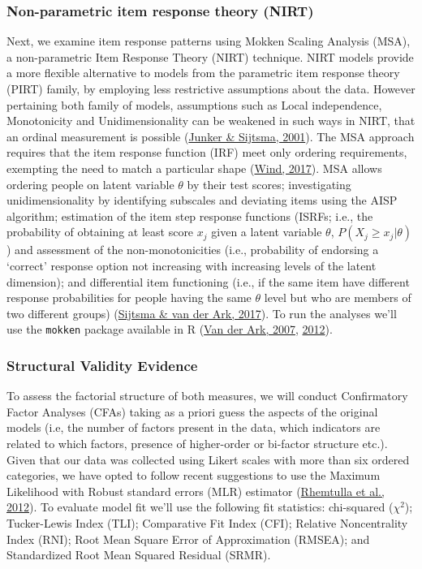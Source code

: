 \documentclass[
  ,doc,11pt, twoside,floatsintext]{apa6}
\begin{document}
\hypertarget{non-parametric-item-response-theory-nirt}{%
\subsubsection{Non-parametric item response theory (NIRT)}\label{non-parametric-item-response-theory-nirt}}

Next, we examine item response patterns using Mokken Scaling Analysis (MSA), a non-parametric Item Response Theory (NIRT) technique. NIRT models provide a more flexible alternative to models from the parametric item response theory (PIRT) family, by employing less restrictive assumptions about the data. However pertaining both family of models, assumptions such as Local independence, Monotonicity and Unidimensionality can be weakened in such ways in NIRT, that an ordinal measurement is possible (\protect\hyperlink{ref-junker2001}{Junker \& Sijtsma, 2001}). The MSA approach requires that the item response function (IRF) meet only ordering requirements, exempting the need to match a particular shape (\protect\hyperlink{ref-wind2017}{Wind, 2017}). MSA allows ordering people on latent variable \(\theta\) by their test scores; investigating unidimensionality by identifying subscales and deviating items using the AISP algorithm; estimation of the item step response functions (ISRFs; i.e., the probability of obtaining at least score \(x_j\) given a latent variable \(\theta\), \(P(X_j \ge x_j|\theta)\)) and assessment of the non-monotonicities (i.e., probability of endorsing a `correct' response option not increasing with increasing levels of the latent dimension); and differential item functioning (i.e., if the same item have different response probabilities for people having the same \(\theta\) level but who are members of two different groups) (\protect\hyperlink{ref-sijtsma2017}{Sijtsma \& van der Ark, 2017}). To run the analyses we'll use the \texttt{mokken} package available in R (\protect\hyperlink{ref-ark2007}{Van der Ark, 2007}, \protect\hyperlink{ref-ark2012}{2012}).

\hypertarget{structural-validity-evidence}{%
\subsubsection{Structural Validity Evidence}\label{structural-validity-evidence}}

To assess the factorial structure of both measures, we will conduct Confirmatory Factor Analyses (CFAs) taking as a priori guess the aspects of the original models (i.e, the number of factors present in the data, which indicators are related to which factors, presence of higher-order or bi-factor structure etc.). Given that our data was collected using Likert scales with more than six ordered categories, we have opted to follow recent suggestions to use the Maximum Likelihood with Robust standard errors (MLR) estimator (\protect\hyperlink{ref-rhemtulla2012}{Rhemtulla et al., 2012}). To evaluate model fit we'll use the following fit statistics: chi-squared (\(\chi^2\)); Tucker-Lewis Index (TLI); Comparative Fit Index (CFI); Relative Noncentrality Index (RNI); Root Mean Square Error of Approximation (RMSEA); and Standardized Root Mean Squared Residual (SRMR).
\end{document}

